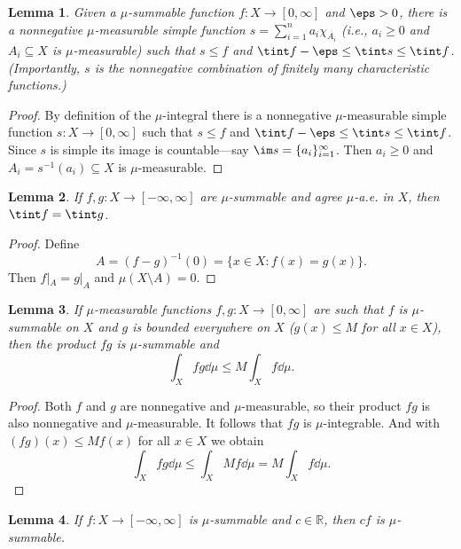 \documentclass[12pt]{article}
\newtheorem{lemma}{Lemma}
\newcommand{\R}{\mathbb{R}}
\begin{document}
\begin{lemma}
    Given a $\mu$-summable function $f : X \to [0, \infty]$ and $\eps > 0$, there is a nonnegative $\mu$-measurable simple function $s = \sum_{i=1}^{n} a_i \chi_{A_i}$ (i.e., $a_i \geq 0$ and $A_i \subseteq X$ is $\mu$-measurable) such that $s \leq f$ and $\tint f - \eps \leq \tint s \leq \tint f$.
    (Importantly, $s$ is the nonnegative combination of finitely many characteristic functions.)
\end{lemma}

\begin{proof}
    By definition of the $\mu$-integral there is a nonnegative $\mu$-measurable simple function $s : X \to [0, \infty]$ such that $s \leq f$ and $\tint f - \eps \leq \tint s \leq \tint f$.
    Since $s$ is simple its image is countable---say $\im s = \{a_i\}_{i=1}^{\infty}$.
    Then $a_i \geq 0$ and $A_i = s^{-1}(a_i) \subseteq X$ is $\mu$-measurable.

\end{proof}


\begin{lemma}
    If $f, g : X \to [-\infty, \infty]$ are $\mu$-summable and agree $\mu$-a.e. in $X$, then $\tint f = \tint g$.
\end{lemma}

\begin{proof}
    Define
    \[
        A = (f - g)^{-1}(0) = \{x \in X : f(x) = g(x)\}.
    \]
    Then $f|_A = g|_A$ and $\mu(X \setminus A) = 0$.

\end{proof}

\begin{lemma}
    If $\mu$-measurable functions $f, g : X \to [0, \infty]$ are such that $f$ is $\mu$-summable on $X$ and $g$ is bounded everywhere on $X$ ($g(x) \leq M$ for all $x \in X$), then the product $fg$ is $\mu$-summable and
    \[
        \int_X fg \dd\mu \leq M \int_X f \dd\mu.
    \]
\end{lemma}

\begin{proof}
    Both $f$ and $g$ are nonnegative and $\mu$-measurable, so their product $fg$ is also nonnegative and $\mu$-measurable.
    It follows that $fg$ is $\mu$-integrable.
    And with $(fg)(x) \leq Mf(x)$ for all $x \in X$ we obtain
    \[
        \int_X fg \dd\mu \leq \int_X Mf \dd\mu = M\int_X f \dd\mu.
    \]
\end{proof}


\begin{lemma}
    If $f : X \to [-\infty, \infty]$ is $\mu$-summable and $c \in \R$, then $cf$ is $\mu$-summable.
\end{lemma}
\end{document}
